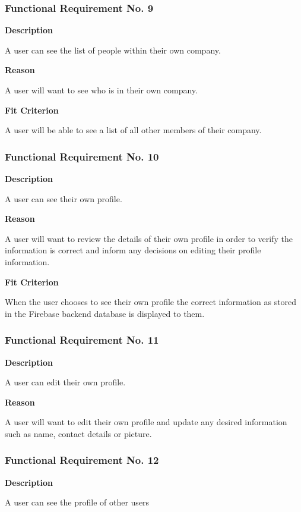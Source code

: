 \subsubsection{Functional Requirement No. 9}
\textbf{Description}

A user can see the list of people within their own company.

\textbf{Reason}

A user will want to see who is in their own company.

\textbf{Fit Criterion}

A user will be able to see a list of all other members of their company.

\subsubsection{Functional Requirement No. 10}

\textbf{Description}

A user can see their own profile.

\textbf{Reason}

A user will want to review the details of their own profile in order to verify the information is correct and inform any decisions on editing their profile information.

\textbf{Fit Criterion}

When the user chooses to see their own profile the correct information as stored in the Firebase backend database is displayed to them.

\subsubsection{Functional Requirement No. 11}

\textbf{Description}

A user can edit their own profile.

\textbf{Reason}

A user will want to edit their own profile and update any desired information such as name, contact details or picture.

\subsubsection{Functional Requirement No. 12}

\textbf{Description}

A user can see the profile of other users

